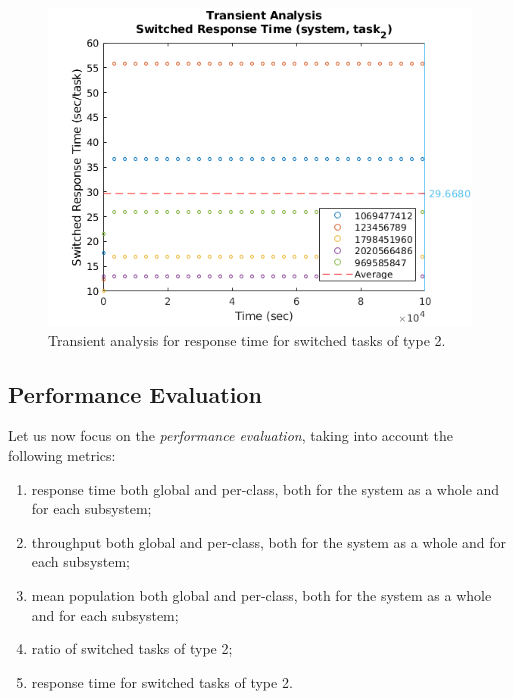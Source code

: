 \begin{figure}
	\includegraphics[width=\columnwidth]{fig/evaluation-transient-analysis-switched-response-time}
	\caption{Transient analysis for response time for switched tasks of type 2.}
	\label{fig:evaluation-transient-analysis-switched-response-time}
\end{figure}


\subsection{Performance Evaluation}
Let us now focus on the \textit{performance evaluation}, taking into account the following metrics:

\begin{enumerate}
	\item response time both global and per-class, both for the system as a whole and for each subsystem;
	\item throughput both global and per-class, both for the system as a whole and for each subsystem;
	\item mean population both global and per-class, both for the system as a whole and for each subsystem;
	\item ratio of switched tasks of type 2;
	\item response time for switched tasks of type 2.
\end{enumerate}

